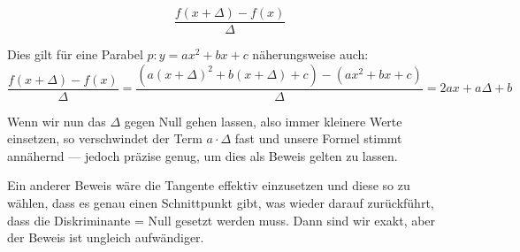 
$$\frac{f(x+\Delta) - f(x)}{\Delta}$$

Dies gilt für eine Parabel $p: y=ax^2+bx+c$ näherungsweise auch:
$$\frac{f(x+\Delta)-f(x)}{\Delta} = \frac{(a(x+\Delta)^2 + b(x+\Delta)
  + c) - (ax^2 + bx +c)}{\Delta}=2ax+a\Delta+b$$

Wenn wir nun das $\Delta$ gegen Null gehen lassen, also immer kleinere
Werte einsetzen, so verschwindet der Term $a\cdot{}\Delta$ fast und unsere
Formel stimmt annähernd --- jedoch präzise genug, um dies als Beweis
gelten zu lassen.

Ein anderer Beweis wäre die Tangente effektiv einzusetzen und diese so
zu wählen, dass es genau einen Schnittpunkt gibt, was wieder darauf
zurückführt, dass die Diskriminante = Null gesetzt werden muss. Dann
sind wir exakt, aber der Beweis ist ungleich aufwändiger.
\newpage

